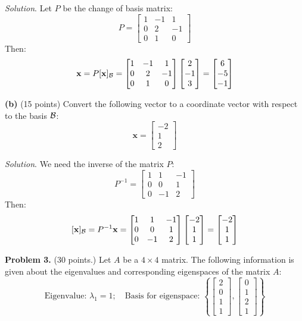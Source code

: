 \documentclass[12pt]{article}
\begin{document}
\emph{Solution}. Let $P$ be the change of basis matrix:
\[
P=\left[\begin{matrix}1 & -1 & 1\\0 & 2 & -1\\0 & 1 & 0\end{matrix}\right]
\]
Then:
\[
\mathbf{x}=P[\mathbf{x}]_{\cal B}=\left[\begin{matrix}1 & -1 & 1\\0 & 2 & -1\\0 & 1 & 0\end{matrix}\right]
\left[\begin{matrix}2\\-1\\3\end{matrix}\right]=\left[\begin{matrix}6\\-5\\-1\end{matrix}\right]
\]
\proofend


\textbf{(b)} (15 points) Convert the following vector to a coordinate vector with respect to the basis ${\cal B}$:
\[
\mathbf{x}=\begin{bmatrix}-2\\1\\2\end{bmatrix}
\]

\emph{Solution}. We need the inverse of the matrix $P$:
\[
P^{-1}=\left[\begin{matrix}1 & 1 & -1\\0 & 0 & 1\\0 & -1 & 2\end{matrix}\right]
\]
Then:
\[
[\mathbf{x}]_{\cal B}=P^{-1}\mathbf{x}=
\left[\begin{matrix}1 & 1 & -1\\0 & 0 & 1\\0 & -1 & 2\end{matrix}\right]
\left[\begin{matrix}-2\\1\\1\end{matrix}\right]=\left[\begin{matrix}-2\\1\\1\end{matrix}\right]
\]
\proofend


\textbf{Problem 3.} (30 points.) Let $A$ be a $4\times 4$ matrix. The following information is given about the eigenvalues and corresponding eigenspaces of the matrix $A$:
\[
\text{Eigenvalue: }\lambda_1=1;\quad
\text{Basis for eigenspace: } \left\{\begin{bmatrix} 2\\ 0\\ 1\\ 1\end{bmatrix},
\begin{bmatrix} 0\\ 1\\ 2\\ 1\end{bmatrix}\right\}
\]
\end{document}
